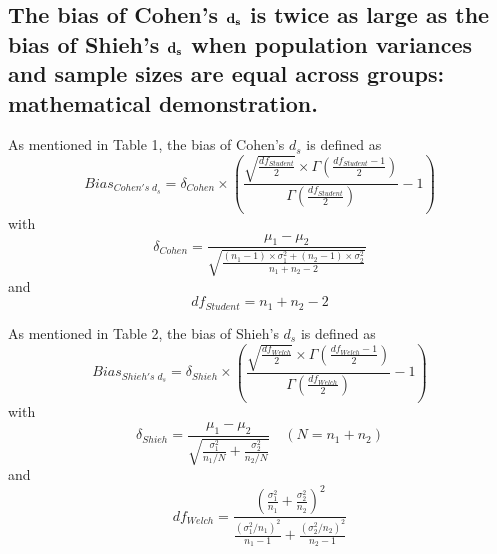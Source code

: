 \documentclass[
  english,
  man,floatsintext]{apa6}
\begin{document}
\endgroup


\clearpage
\makeatletter
\efloat@restorefloats
\makeatother


\begin{appendix}
\section{}
\hypertarget{the-bias-of-cohens-bf-d_s-is-twice-as-large-as-the-bias-of-shiehs-bf-d_s-when-population-variances-and-sample-sizes-are-equal-across-groups-mathematical-demonstration.}{%
\subsection{\texorpdfstring{The bias of Cohen's \(\bf d_s\) is twice as
large as the bias of Shieh's \(\bf d_s\) when population variances and
sample sizes are equal across groups: mathematical
demonstration.}{The bias of Cohen's \textbackslash bf d\_s is twice as large as the bias of Shieh's \textbackslash bf d\_s when population variances and sample sizes are equal across groups: mathematical demonstration.}}\label{the-bias-of-cohens-bf-d_s-is-twice-as-large-as-the-bias-of-shiehs-bf-d_s-when-population-variances-and-sample-sizes-are-equal-across-groups-mathematical-demonstration.}}

As mentioned in Table 1, the bias of Cohen's \(d_s\) is defined as
\begin{equation} 
Bias_{Cohen's \; d{_s}}= \delta_{Cohen} \times \left( \frac{\sqrt{\frac{df_{Student}}{2}} \times \Gamma{\left(\frac{df_{Student}-1}{2}\right)}}{\Gamma{\left( \frac{df_{Student}}{2}\right)}} -1 \right)
\label{eq:Cohenbias}
\end{equation} with \begin{equation*} 
\delta_{Cohen}=\frac{\mu_1-\mu_2}{\sqrt{\frac{(n_1-1)\times \sigma^2_1+(n_2-1)\times\sigma^2_2}{n_1+n_2-2}}}
\label{eq:Cohendelta}
\end{equation*} and \begin{equation*} 
df_{Student}=n_1+n_2-2
\label{eq:Cohendf}
\end{equation*}

As mentioned in Table 2, the bias of Shieh's \(d_s\) is defined as
\begin{equation} 
Bias_{Shieh's \; d{_s}}=\delta_{Shieh} \times \left( \frac{\sqrt{\frac{df_{Welch}}{2}} \times \Gamma{\left(\frac{df_{Welch}-1}{2}\right)}}{\Gamma{\left( \frac{df_{Welch}}{2}\right)}} -1 \right)
\label{eq:Shiehbias}
\end{equation} with \begin{equation*} 
\delta_{Shieh}=\frac{\mu_1-\mu_2}{\sqrt{\frac{\sigma^2_1}{n_1/N}+\frac{\sigma^2_2}{n_2/N}}} \quad (N=n_1+n_2)
\label{eq:Shiehdelta}
\end{equation*} and \begin{equation*} 
df_{Welch}=\frac{\left(\frac{\sigma^2_1}{n_1}+\frac{\sigma^2_2}{n_2} \right)^2}{\frac{(\sigma^2_1/n_1)^2}{n_1-1}+\frac{(\sigma^2_2/n_2)^2}{n_2-1}}
\label{eq:Welchdf}
\end{equation*}


\end{appendix}
\end{document}
